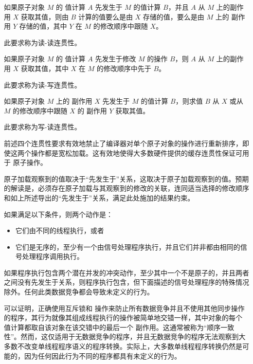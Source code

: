 \pnum
{}%
如果原子对象 $M$ 的
%
值计算 $A$ 先发生于 $M$ 的值计算 $B$，并且 $A$ 从 $M$ 上的副作用 $X$ 获取其值，则由 $B$ 计算的值要么是由 $X$ 存储的值，要么是由 $M$ 上的
%
副作用 $Y$ 存储的值，其中 $Y$ 在 $M$ 的修改顺序中跟随 $X$。
\begin{note}
此要求称为读-读连贯性。
\end{note}

\pnum
{}%
如果原子对象 $M$ 的
%
值计算 $A$ 先发生于修改 $M$ 的操作 $B$，则 $A$ 从 $M$ 上的副作用 $X$ 获取其值，其中 $X$ 在 $M$ 的修改顺序中先于 $B$。
\begin{note}
此要求称为读-写连贯性。
\end{note}

\pnum
{}%
如果原子对象 $M$ 上的
%
副作用 $X$ 先发生于 $M$ 的值计算 $B$，则求值 $B$ 从 $X$ 或从 $M$ 的修改顺序中跟随 $X$ 的
%
副作用 $Y$ 获取其值。
\begin{note}
此要求称为写-读连贯性。
\end{note}

\pnum
\begin{note}
前述四个连贯性要求有效地禁止了编译器对单个原子对象的操作进行重新排序，即使这两个操作都是宽松加载。这有效地使得大多数硬件提供的缓存连贯性保证可用于 \Cpp{} 原子操作。
\end{note}

\pnum
\begin{note}
原子加载观察到的值取决于“先发生于”关系，这取决于原子加载观察到的值。预期的解读是，必须存在原子加载与其观察到的修改的关联，连同适当选择的修改顺序和如上所述导出的“先发生于”关系，满足此处施加的结果约束。
\end{note}

\pnum
如果满足以下条件，则两个动作是：
\begin{itemize}
\item 它们由不同的线程执行，或者
\item 它们是无序的，至少有一个由信号处理程序执行，并且它们并非都由相同的信号处理程序调用执行。
\end{itemize}
如果程序执行包含两个潜在并发的冲突动作，至少其中一个不是原子的，并且两者之间没有先发生于关系，则程序执行包含，但下面描述的信号处理程序的特殊情况除外。任何此类数据竞争都会导致未定义的行为。
\begin{note}
可以证明，正确使用互斥锁和  操作来防止所有数据竞争并且不使用其他同步操作的程序，其行为就像其组成线程执行的操作被简单地交错一样，其中对象的每个
%
值计算都取自该对象在该交错中的最后一个
%
副作用。这通常被称为“顺序一致性”。然而，这仅适用于无数据竞争的程序，并且无数据竞争的程序无法观察到大多数不改变单线程程序语义的程序转换。实际上，大多数单线程程序转换仍然是可能的，因为任何因此行为不同的程序都具有未定义的行为。
\end{note}

